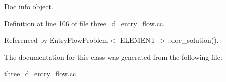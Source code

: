 Doc info object. 



Definition at line 106 of file three\+\_\+d\+\_\+entry\+\_\+flow.\+cc.



Referenced by Entry\+Flow\+Problem$<$ E\+L\+E\+M\+E\+N\+T $>$\+::doc\+\_\+solution().



The documentation for this class was generated from the following file\+:\begin{DoxyCompactItemize}
\item 
\hyperlink{three__d__entry__flow_8cc}{three\+\_\+d\+\_\+entry\+\_\+flow.\+cc}\end{DoxyCompactItemize}
